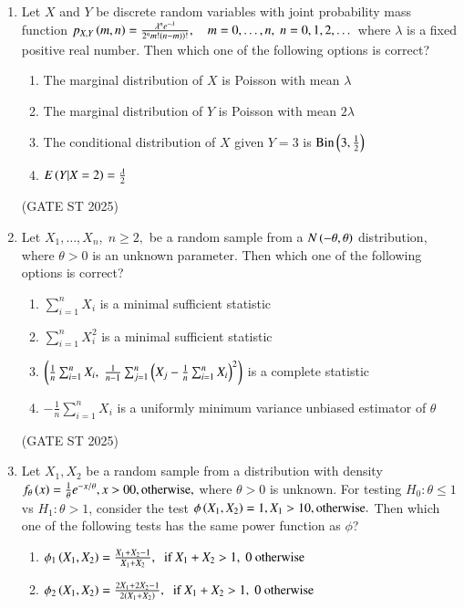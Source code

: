 \documentclass[journal,12pt,onecolumn]{IEEEtran}
\theoremstyle{remark}
\begin{document}
\begin{enumerate}
\item Let $X$ and $Y$ be discrete random variables with joint probability mass function  
$
p_{X,Y}\left(m,n\right)= \frac{\lambda^n e^{-\lambda}}{2^n m! \left(n-m\right))!}, \quad m = 0, \dots, n,\; n = 0,1,2,\dots
$  
where $\lambda$ is a fixed positive real number. Then which one of the following options is correct?
\begin{enumerate}
\item The marginal distribution of $X$ is Poisson with mean $\lambda$
\item The marginal distribution of $Y$ is Poisson with mean $2\lambda$
\item The conditional distribution of $X$ given $Y=3$ is $\text{Bin}\left(3,\tfrac{1}{2}\right)$
\item $E\left(Y|X=2\right) = \tfrac{\lambda}{2}$
\end{enumerate}
\hfill{(GATE ST 2025)}
\item Let $X_1,\dots,X_n, \; n \geq 2,$ be a random sample from a $N\left(-\theta,\theta\right)$ distribution, where $\theta>0$ is an unknown parameter. Then which one of the following options is correct?
\begin{enumerate}
\item $\sum_{i=1}^n X_i$ is a minimal sufficient statistic
\item $\sum_{i=1}^n X_i^2$ is a minimal sufficient statistic
\item $\left( \tfrac{1}{n}\sum_{i=1}^n X_i,\; \tfrac{1}{n-1}\sum_{j=1}^n \left(X_j - \tfrac{1}{n}\sum_{i=1}^n X_i\right)^2\right)$ is a complete statistic
\item $-\tfrac{1}{n}\sum_{i=1}^n X_i$ is a uniformly minimum variance unbiased estimator of $\theta$
\end{enumerate}
\hfill{(GATE ST 2025)}
\item Let $X_1,X_2$ be a random sample from a distribution with density
$
f_\theta\left(x\right) = 
\tfrac{1}{\theta} e^{-x/\theta},  x>0 \\
0,  \text{otherwise},
$
where $\theta>0$ is unknown. For testing $H_0:\theta\leq 1$ vs $H_1:\theta>1$, consider the test
$
\phi\left(X_1,X_2\right) = 
1,  X_1>1 \\
0,  \text{otherwise}.
$
Then which one of the following tests has the same power function as $\phi$?
\begin{enumerate}
\item $\phi_1\left(X_1,X_2\right) = \frac{X_1+X_2-1}{X_1+X_2}, \;\; \text{if } X_1+X_2>1, \; 0 \text{ otherwise}$
\item $\phi_2\left(X_1,X_2\right) = \frac{2X_1+2X_2-1}{2\left(X_1+X_2\right)}, \;\; \text{if } X_1+X_2>1, \; 0 \text{ otherwise}$

\end{enumerate}
\end{enumerate}
\end{document}
